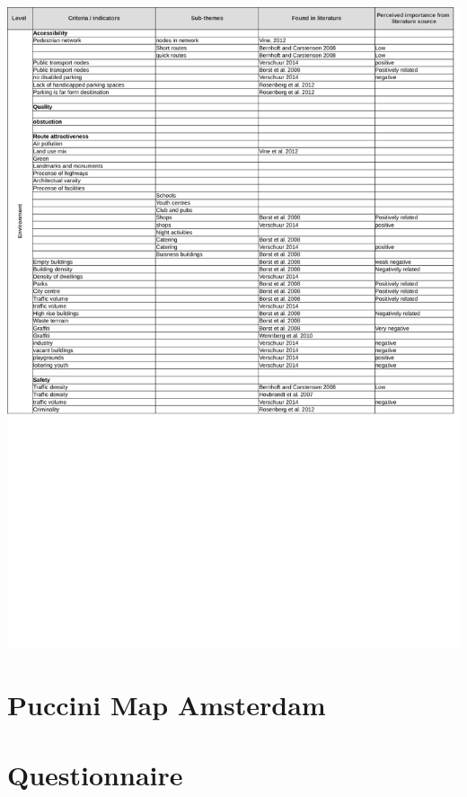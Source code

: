\begin{appendix}
\includegraphics[width=\textwidth]{img/annex/A4_environment_criteria.pdf}

\section{Puccini Map Amsterdam}
\label{pucciniMap}

\clearpage

\section{Questionnaire}\label{Aquest}


\clearpage


\end{appendix}
